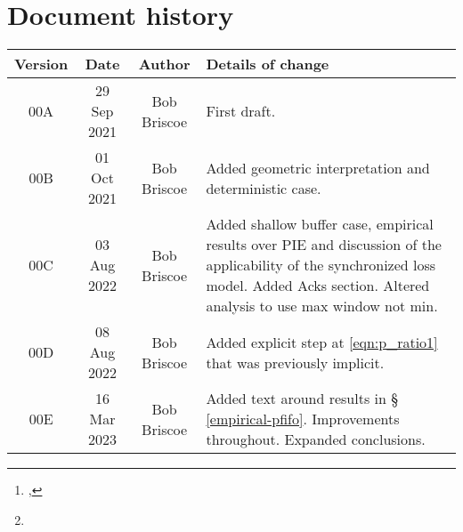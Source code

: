 \documentclass[a4paper,twoside,twocolumn]{article}
\title{\metatitle}%
\author{\metaauthori%
\thanks{\metamaili, %
\metaaddress}%
\ %
\and \metaauthorii%
\thanks{\metamailii}%
}
\date{\metadate}%
\newcommand*{\metaversion}{00E}
\newcommand*{\metadate}{16 Mar 2023}
\begin{document}
%


\maketitle%
\thispagestyle{first}

\begin{abstract}
{\small\noindent%
}      %
\end{abstract}

\newpage
{}

{%
\scriptsize%
}


\onecolumn%
\section*{Document history}

\begin{tabular}{|c|c|c|p{3.5in}|}
 \hline
Version &Date &Author &Details of change \\
 \hline\hline
00A          &29 Sep 2021&Bob Briscoe &First draft.\\\hline%
00B          &01 Oct 2021  &Bob Briscoe &Added geometric interpretation and deterministic case.\\\hline%
00C          &03 Aug 2022  &Bob Briscoe &Added shallow buffer case, empirical results over PIE and discussion of the applicability of the synchronized loss model. Added Acks section. Altered analysis to use max window not min.\\\hline%
00D          &08 Aug 2022  &Bob Briscoe &Added explicit step at \autoref{eqn:p_ratio1} that was previously implicit.\\\hline%
\metaversion &\metadate  &Bob Briscoe &Added text around results in \S\,\ref{empirical-pfifo}. Improvements throughout. Expanded conclusions.\\\hline%
\hline%
\end{tabular}
\end{document}
